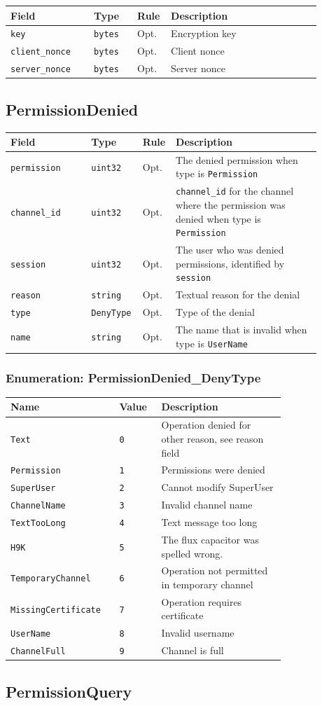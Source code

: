 \documentclass[11pt]{article} %
\newenvironment{mumbleMessageEx}
{%
	\small
	\renewcommand\arraystretch{1.5}
	\begin{tabular}{p{0.25\linewidth}p{0.13\linewidth}p{0.05\linewidth}p{0.45\linewidth}}
	Field & Type & Rule & Description \\
	\hline
}
{%
	\end{tabular}
	\renewcommand\arraystretch{1.0}
}
\newcommand{\mumbleMessageExItem}[4]{ \texttt{#1} & \texttt{#2} & #3 & #4 \\ }
\newenvironment{mumbleEnum}
{%
	\small
	\renewcommand\arraystretch{1.5}
	\begin{tabular}{p{0.25\linewidth}p{0.13\linewidth}p{0.4\linewidth}}
	Name & Value & Description \\
	\hline
}
{%
	\end{tabular}
	\renewcommand\arraystretch{1.0}
}
\newcommand{\mumbleEnumItem}[3]{ \texttt{#1} & \texttt{#2} & #3 \\ }
\begin{document}
\begin{mumbleMessageEx}
\mumbleMessageExItem{key}{bytes}{Opt.}{Encryption key}
\mumbleMessageExItem{client\_nonce}{bytes}{Opt.}{Client nonce}
\mumbleMessageExItem{server\_nonce}{bytes}{Opt.}{Server nonce}
\end{mumbleMessageEx}

\subsection{PermissionDenied}
\label{msg:permissionDenied}

\begin{mumbleMessageEx}
\mumbleMessageExItem{permission}{uint32}{Opt.}{The denied permission when type is \texttt{Permission}}
\mumbleMessageExItem{channel\_id}{uint32}{Opt.}{\texttt{channel\_id} for the channel where the permission was denied when type is \texttt{Permission}}
\mumbleMessageExItem{session}{uint32}{Opt.}{The user who was denied permissions, identified by \texttt{session}}
\mumbleMessageExItem{reason}{string}{Opt.}{Textual reason for the denial}
\mumbleMessageExItem{type}{DenyType}{Opt.}{Type of the denial}
\mumbleMessageExItem{name}{string}{Opt.}{The name that is invalid when type is \texttt{UserName}}
\end{mumbleMessageEx}

\subsubsection{Enumeration: PermissionDenied\_DenyType}
\label{msg:permissionDenied:denyType}

\begin{mumbleEnum}
\mumbleEnumItem{Text}{0}{Operation denied for other reason, see reason field}
\mumbleEnumItem{Permission}{1}{Permissions were denied}
\mumbleEnumItem{SuperUser}{2}{Cannot modify SuperUser}
\mumbleEnumItem{ChannelName}{3}{Invalid channel name}
\mumbleEnumItem{TextTooLong}{4}{Text message too long}
\mumbleEnumItem{H9K}{5}{The flux capacitor was spelled wrong.}
\mumbleEnumItem{TemporaryChannel}{6}{Operation not permitted in temporary channel}
\mumbleEnumItem{MissingCertificate}{7}{Operation requires certificate}
\mumbleEnumItem{UserName}{8}{Invalid username}
\mumbleEnumItem{ChannelFull}{9}{Channel is full}
\end{mumbleEnum}

\subsection{PermissionQuery}
\label{msg:permissionQuery}
\end{document}
